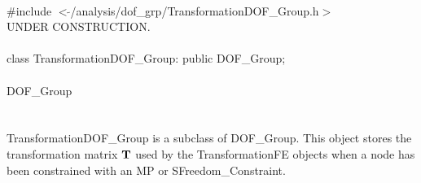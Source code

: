 
   \\
\indent \#include $<\tilde{ }$/analysis/dof\_grp/TransformationDOF\_Group.h$>$  \\

UNDER CONSTRUCTION.\\

  \\
\indent class TransformationDOF\_Group: public DOF\_Group;  \\


  \\
\indent DOF\_Group \\
\indent{} \\ 

  \\
\indent TransformationDOF\_Group is a subclass of DOF\_Group. This
object stores the transformation matrix ${\bf T}$ used by the
TransformationFE objects when a node has been constrained with an MP
or SFreedom\_Constraint.


